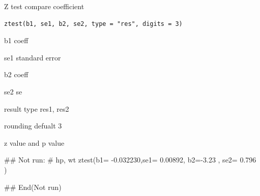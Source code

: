 \documentclass[a4paper]{book}
\begin{document}
%
\begin{Description}
Z test compare coefficient
\end{Description}
%
\begin{Usage}
\begin{verbatim}
ztest(b1, se1, b2, se2, type = "res", digits = 3)
\end{verbatim}
\end{Usage}
%
\begin{Arguments}
\begin{ldescription}
\item[\code{b1}] b1 coeff

\item[\code{se1}] se1 standard error

\item[\code{b2}] b2 coeff

\item[\code{se2}] se2 se

\item[\code{type}] result type res1, res2

\item[\code{digits}] rounding defualt 3
\end{ldescription}
\end{Arguments}
%
\begin{Value}
z value and p value
\end{Value}
%
\begin{Examples}
\begin{ExampleCode}
\#\# Not run: 
# hp, wt
ztest(b1= -0.032230,se1= 0.00892,   b2=-3.23 , se2= 0.796 )

## End(Not run)


\end{ExampleCode}
\end{Examples}
\end{document}

